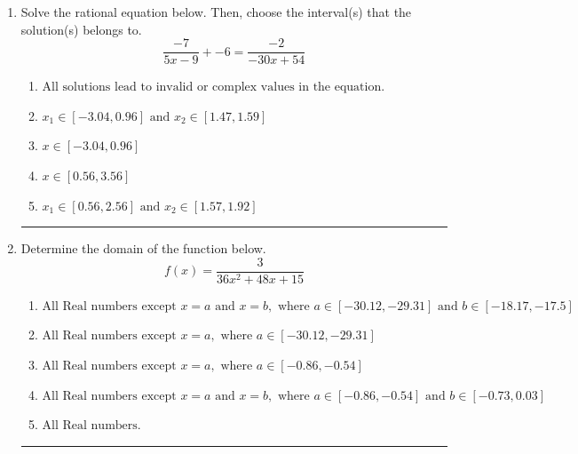 \documentclass[14pt]{extbook}
\newcommand{\litem}[1]{\item#1\hspace*{-1cm}\rule{\textwidth}{0.4pt}}
\begin{document}
\begin{enumerate}
{\begin{enumerate}[label=\Alph*.]
\end{enumerate} }
\litem{
Solve the rational equation below. Then, choose the interval(s) that the solution(s) belongs to.\[ \frac{-7}{5x -9} + -6 = \frac{-2}{-30x + 54} \]\begin{enumerate}[label=\Alph*.]
\item \( \text{All solutions lead to invalid or complex values in the equation.} \)
\item \( x_1 \in [-3.04, 0.96] \text{ and } x_2 \in [1.47,1.59] \)
\item \( x \in [-3.04,0.96] \)
\item \( x \in [0.56,3.56] \)
\item \( x_1 \in [0.56, 2.56] \text{ and } x_2 \in [1.57,1.92] \)

\end{enumerate} }
\litem{
Determine the domain of the function below.\[ f(x) = \frac{3}{36x^{2} +48 x + 15} \]\begin{enumerate}[label=\Alph*.]
\item \( \text{All Real numbers except } x = a \text{ and } x = b, \text{ where } a \in [-30.12, -29.31] \text{ and } b \in [-18.17, -17.5] \)
\item \( \text{All Real numbers except } x = a, \text{ where } a \in [-30.12, -29.31] \)
\item \( \text{All Real numbers except } x = a, \text{ where } a \in [-0.86, -0.54] \)
\item \( \text{All Real numbers except } x = a \text{ and } x = b, \text{ where } a \in [-0.86, -0.54] \text{ and } b \in [-0.73, 0.03] \)
\item \( \text{All Real numbers.} \)


\end{enumerate}}
\end{enumerate}
\end{document}
